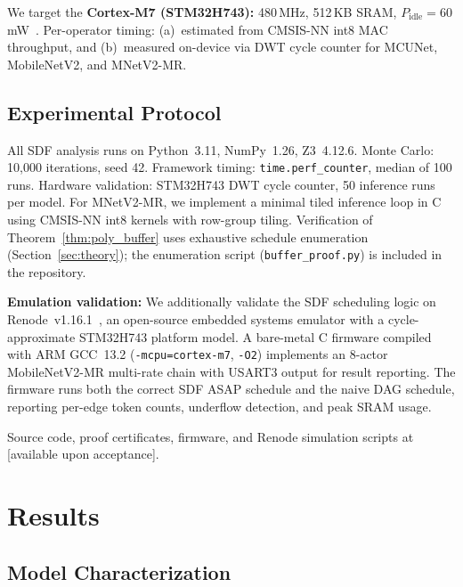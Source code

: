 \documentclass[journal]{IEEEtran}
\begin{document}
We target the \textbf{Cortex-M7 (STM32H743):} 480\,MHz, 512\,KB SRAM, $P_{\mathrm{idle}} = 60$\,mW~\cite{stm32h743}. Per-operator timing: (a)~estimated from CMSIS-NN int8 MAC throughput, and (b)~measured on-device via DWT cycle counter for MCUNet, MobileNetV2, and MNetV2-MR.

\subsection{Experimental Protocol}

All SDF analysis runs on Python~3.11, NumPy~1.26, Z3~4.12.6.
Monte Carlo: 10{,}000 iterations, seed 42.
Framework timing: \texttt{time.perf\_counter}, median of 100 runs.
Hardware validation: STM32H743 DWT cycle counter, 50 inference runs per model.
For MNetV2-MR, we implement a minimal tiled inference loop in C using CMSIS-NN int8 kernels with row-group tiling.
Verification of Theorem~\ref{thm:poly_buffer} uses exhaustive schedule enumeration (Section~\ref{sec:theory}); the enumeration script (\texttt{buffer\_proof.py}) is included in the repository.

\textbf{Emulation validation:}
We additionally validate the SDF scheduling logic on Renode~v1.16.1~\cite{renode2024}, an open-source embedded systems emulator with a cycle-approximate STM32H743 platform model.
A bare-metal C firmware compiled with ARM GCC~13.2 (\texttt{-mcpu=cortex-m7}, \texttt{-O2}) implements an 8-actor MobileNetV2-MR multi-rate chain with USART3 output for result reporting.
The firmware runs both the correct SDF ASAP schedule and the naive DAG schedule, reporting per-edge token counts, underflow detection, and peak SRAM usage.

Source code, proof certificates, firmware, and Renode simulation scripts at [available upon acceptance].

\section{Results}

\subsection{Model Characterization}
\label{sec:characterization}
\end{document}

